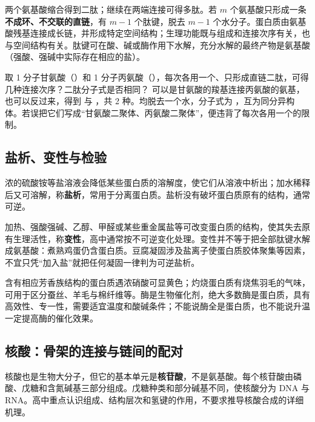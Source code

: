 两个氨基酸缩合得到二肽；继续在两端连接可得多肽。若 $m$ 个氨基酸只形成一条\textbf{不成环、不交联的直链}，有 $m-1$ 个肽键，脱去 $m-1$ 个水分子。蛋白质由氨基酸残基连接成长链，并形成特定空间结构；生理功能既与组成和连接次序有关，也与空间结构有关。肽键可在酸、碱或酶作用下水解，充分水解的最终产物是氨基酸（强酸、强碱中实际存在相应的盐）。

\begin{liti}[次序与守恒]
取 1 分子甘氨酸（）和 1 分子丙氨酸（），每次各用一个、只形成直链二肽，可得几种连接次序？二肽分子式是否相同？
\tcblower
\jie 可以是甘氨酸的羧基连接丙氨酸的氨基，也可以反过来，得到
 与 ，共 2 种。均脱去一个水，分子式为 ，互为同分异构体。若误把它们写成“甘氨酸二聚体、丙氨酸二聚体”，便违背了每次各用一个的限制。
\end{liti}

\subsection{盐析、变性与检验}
浓的硫酸铵等盐溶液会降低某些蛋白质的溶解度，使它们从溶液中析出；加水稀释后又可溶解，称\textbf{盐析}，常用于分离蛋白质。盐析没有破坏蛋白质原有的结构，通常可逆。

加热、强酸强碱、乙醇、甲醛或某些重金属盐等可改变蛋白质的结构，使其失去原有生理活性，称\textbf{变性}，高中通常按不可逆变化处理。变性并不等于把全部肽键水解成氨基酸：煮熟鸡蛋仍含蛋白质。豆腐凝固涉及盐离子使蛋白质胶体聚集等因素，不宜只凭“加入盐”就把任何凝固一律判为可逆盐析。

含有相应芳香族结构的蛋白质遇浓硝酸可显黄色；灼烧蛋白质有烧焦羽毛的气味，可用于区分蚕丝、羊毛与棉纤维等。酶是生物催化剂，绝大多数酶是蛋白质，具有高效性、专一性，需要适宜温度和酸碱条件；不能说酶全是蛋白质，也不能说升温一定提高酶的催化效果。

\subsection{核酸：骨架的连接与链间的配对}
核酸也是生物大分子，但它的基本单元是\textbf{核苷酸}，不是氨基酸。每个核苷酸由磷酸、戊糖和含氮碱基三部分组成。戊糖种类和部分碱基不同，使核酸分为 DNA 与 RNA。高中重点认识组成、结构层次和氢键的作用，不要求推导核酸合成的详细机理。


